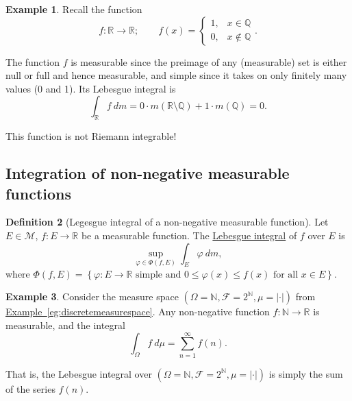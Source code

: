 \documentclass[a4paper,12pt]{scrreprt}
\newcommand{\R}{\mathbb{R}}
\newcommand{\Q}{\mathbb{Q}}
\newcommand{\N}{\mathbb{N}}
\newcommand{\defn}[1]{\ul{#1}}
\newcommand{\abs}[1]{\left|#1\right|}
\theoremstyle{definition}
\newtheorem{definition}{Definition}
\newtheorem{example}[definition]{Example}
\theoremstyle{plain}
\theoremstyle{remark}
\begin{document}
\begin{example}
  Recall the function
  \begin{equation*}
    f\colon \R \to \R;\qquad f(x) =
    \begin{cases}
      1, &x \in \Q \\
      0, &x \notin \Q
    \end{cases}.
  \end{equation*}

  The function $f$ is measurable since the preimage of any (measurable) set is either null or full and hence measurable, and simple since it takes on only finitely many values (0 and 1). Its Lebesgue integral is
  \begin{equation*}
    \int_{\R} f\ dm = 0\cdot m(\R \setminus \Q) + 1 \cdot m(\Q) = 0.
  \end{equation*}

  This function is not Riemann integrable!
\end{example}

\subsection{Integration of non-negative measurable functions}
\begin{definition}[Legesgue integral of a non-negative measurable function]
  \label{def:lebesgueintegralofnonnegativemeasurablefunction}
  Let $E \in \mathcal{M}$, $f\colon E \to \R$ be a measurable function. The \defn{Lebesgue integral} of $f$ over $E$ is
  \begin{equation*}
    \sup_{\varphi \in \Phi(f, E)} \int_{E} \varphi\ dm,
  \end{equation*}
  where $\Phi(f, E) = \left\{ \varphi\colon E \to \R \text{ simple and }0 \leq \varphi(x) \leq f(x)\text{ for all }x \in E \right\}$.
\end{definition}

\begin{example}
  \label{eg:lebesgueintegralcanbesum}
  Consider the measure space $(\Omega = \N, \mathcal{F} = 2^{\N}, \mu = \abs{\cdot})$ from \hyperref[eg:discretemeasurespace]{Example~\ref*{eg:discretemeasurespace}}. Any non-negative function $f\colon \N \to \R$ is measurable, and the integral
  \begin{equation*}
    \int_{\Omega} f\ d\mu = \sum_{n = 1}^{\infty} f(n).
  \end{equation*}

  That is, the Lebesgue integral over $(\Omega = \N, \mathcal{F} = 2^{\N}, \mu = \abs{\cdot})$ is simply the sum of the series $f(n)$.
\end{example}
\end{document}
